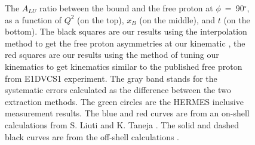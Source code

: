 \begin{figure}[tp]
\caption{ The $A_{LU}$ ratio between the bound and the free proton at 
   $\phi$~=~90$^{\circ}$, as a function of $Q^2$ (on the top), $x_B$ (on the 
   middle), and $t$ (on the bottom). The black squares are our results using 
   the interpolation method to get the free proton asymmetries at our kinematic 
   , the red squares are our results using the method of tuning our kinematics 
   to get kinematics similar to the published free proton from E1DVCS1 
   experiment. The gray band stands for the systematic errors calculated as the 
   difference between the two extraction methods. The green circles are the 
   HERMES inclusive measurement \cite{HERMES_BSA} results. The blue and red 
   curves are from an on-shell calculations from S.  Liuti and K.  Taneja 
   \cite{simonetta_2}. The solid and dashed black curves are from the off-shell 
   calculations \cite{EMC_vadim_2}.} \label{fig:incoh_EMC_ratio_ALU_proton_two}
\end{figure}






